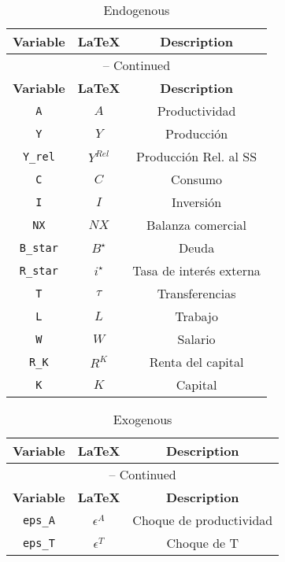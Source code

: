 \begin{center}
\begin{longtable}{ccc}
\caption{Endogenous}\\%
\hline%
\multicolumn{1}{c}{\textbf{Variable}} &
\multicolumn{1}{c}{\textbf{\LaTeX}} &
\multicolumn{1}{c}{\textbf{Description}}\\%
\hline\hline%
\endfirsthead
\multicolumn{3}{c}{{\tablename} \thetable{} -- Continued}\\%
\hline%
\multicolumn{1}{c}{\textbf{Variable}} &
\multicolumn{1}{c}{\textbf{\LaTeX}} &
\multicolumn{1}{c}{\textbf{Description}}\\%
\hline\hline%
\endhead
\texttt{A} & $A$ & Productividad\\
\texttt{Y} & $Y$ & Producción\\
\texttt{Y\_rel} & $Y^{Rel}$ & Producción Rel. al SS\\
\texttt{C} & $C$ & Consumo\\
\texttt{I} & $I$ & Inversión\\
\texttt{NX} & $NX$ & Balanza comercial\\
\texttt{B\_star} & $B^{\star}$ & Deuda\\
\texttt{R\_star} & $i^{\star}$ & Tasa de interés externa\\
\texttt{T} & $\tau$ & Transferencias\\
\texttt{L} & $L$ & Trabajo\\
\texttt{W} & $W$ & Salario\\
\texttt{R\_K} & $R^{K}$ & Renta del capital\\
\texttt{K} & $K$ & Capital\\
\hline%
\end{longtable}
\end{center}
\begin{center}
\begin{longtable}{ccc}
\caption{Exogenous}\\%
\hline%
\multicolumn{1}{c}{\textbf{Variable}} &
\multicolumn{1}{c}{\textbf{\LaTeX}} &
\multicolumn{1}{c}{\textbf{Description}}\\%
\hline\hline%
\endfirsthead
\multicolumn{3}{c}{{\tablename} \thetable{} -- Continued}\\%
\hline%
\multicolumn{1}{c}{\textbf{Variable}} &
\multicolumn{1}{c}{\textbf{\LaTeX}} &
\multicolumn{1}{c}{\textbf{Description}}\\%
\hline\hline%
\endhead
\texttt{eps\_A} & $\epsilon^{A}$ & Choque de productividad\\
\texttt{eps\_T} & $\epsilon^{T}$ & Choque de T\\
\hline%
\end{longtable}
\end{center}
